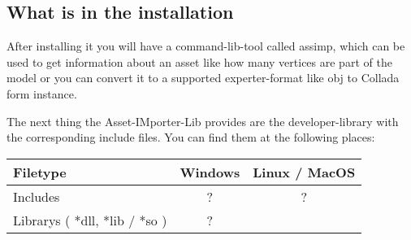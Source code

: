 \subsection{What is in the installation}
After installing it you will have a command-lib-tool called assimp, which can be used to get information about an asset like how many vertices are part of the model or you 
can convert it to a supported experter-format like obj to Collada form instance.
\par
The next thing the Asset-IMporter-Lib provides are the developer-library with the corresponding include files. You can find them at the following places:
\begin{center}
\begin{tabular}{ | l | c | c | }
\hline
Filetype & Windows & Linux / MacOS \\
\hline
Includes                       & ?       & ?             \\
\hline
Librarys ( *dll, *lib / *so )  & ?       &               \\
\hline

\end{tabular}
\end{center}


